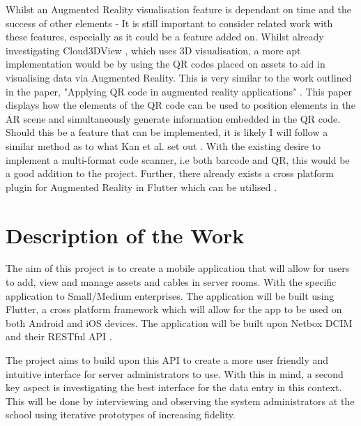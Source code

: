 \documentclass [11pt,letterpaper]{article}
\begin{document}
Whilst an Augmented Reality visualisation feature is dependant on time and the success of other elements - It is still important to consider related work with these features, especially as it could be a feature added on. Whilst already investigating Cloud3DView \cite{cloud3dview}, which uses 3D visualisation, a more apt implementation would be by using the QR codes placed on assets to aid in visualising data via Augmented Reality. This is very similar to the work outlined in the paper, "Applying QR code in augmented reality applications" \cite{applyingQR}. This paper displays how the elements of the QR code can be used to position elements in the AR scene and simultaneously generate information embedded in the QR code. Should this be a feature that can be implemented, it is likely I will follow a similar method as to what Kan et al. set out \cite{applyingQR}. With the existing desire to implement a multi-format code scanner, i.e both barcode and QR, this would be a good addition to the project. Further, there already exists a cross platform plugin for Augmented Reality in Flutter which can be utilised \cite{ar_flutter}.

\section{Description of the Work}
\label{sec:work}
The aim of this project is to create a mobile application that will allow for users to add, view and manage assets and cables in server rooms. With the specific application to Small/Medium enterprises. The application will be built using Flutter, a cross platform framework which will allow for the app to be used on both Android and iOS devices. The application will be built upon Netbox DCIM \cite{Netbox} and their RESTful API \cite{NetboxAPI}. 

The project aims to build upon this API to create a more user friendly and intuitive interface for server administrators to use. With this in mind, a second key aspect is investigating the best interface for the data entry in this context. This will be done by interviewing and observing the system administrators at the school using iterative prototypes of increasing fidelity.
\end{document}
